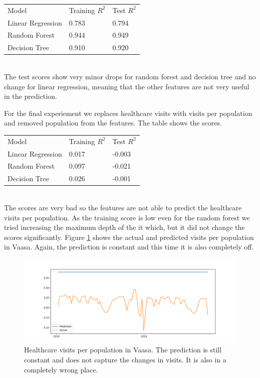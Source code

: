\documentclass[a4paper, 12pt, english]{article}
\begin{document}
\begin{tabular}{l l l}
Model & Training \(R^2\) & Test \(R^2\) \\
Linear Regression & 0.783 & 0.794 \\
Random Forest & 0.944 & 0.949 \\
Decision Tree & 0.910 & 0.920 \\
\end{tabular}
\\

The test scores show very minor drops for random forest
and decision tree and no change for linear regression,
meaning that the other features are not very useful
in the prediction.

For the final experiement we replaces healthcare
visits with visits per population and
removed population from the features.
The table shows the scores.\\

\begin{tabular}{l l l}
Model & Training \(R^2\) & Test \(R^2\) \\
Linear Regression & 0.017 & -0.003 \\
Random Forest & 0.097 & -0.021 \\
Decision Tree & 0.026 & -0.001 \\
\end{tabular}
\\

The scores are very bad so the features are not able
to predict the healthcare visits per population.
As the training score is low even for
the random forest we tried increasing the maximum depth of
the it which, but it did not change the scores significantly.
Figure \ref{predictions2} shows the actual and predicted
visits per population in Vaasa. Again, the prediction is
constant and this time it is also completely off.

\begin{figure}[h]
\includegraphics[width=\textwidth]{predictions2}
\caption{
Healthcare visits per population in Vaasa.
The prediction is still constant and does not
capture the changes in
visits. It is also in a completely wrong place.
}
\label{predictions2}
\end{figure}
\end{document}
